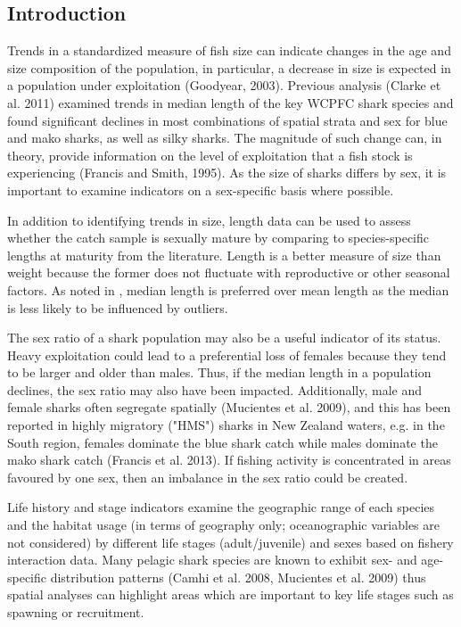 \documentclass[12pt]{SCreport}
\begin{document}
      \subsection{Introduction}
Trends in a standardized measure of fish size can indicate changes in the age and size composition of the population, in particular, a decrease in size is expected in a population under exploitation (Goodyear, 2003).  Previous analysis (Clarke et al. 2011) examined trends in median length of the key WCPFC shark species and found significant declines in most combinations of spatial strata and sex for blue and mako sharks, as well as silky sharks.  The magnitude of such change can, in theory, provide information on the level of exploitation that a fish stock is experiencing (Francis and Smith, 1995). As the size of sharks differs by sex, it is important to examine indicators on a sex-specific basis where possible. 

In addition to identifying trends in size, length data can be used to assess whether the catch sample is sexually mature by comparing to species-specific lengths at maturity from the literature.  Length is a better measure of size than weight because the former does not fluctuate with reproductive or other seasonal factors. As noted in \citet{Francis2014_a}, median length is preferred over mean length as the median is less likely to be influenced by outliers. 

The sex ratio of a shark population may also be a useful indicator of its status. Heavy exploitation could lead to a preferential loss of females because they tend to be larger and older than males. Thus, if the median length in a population declines, the sex ratio may also have been impacted. Additionally, male and female sharks often segregate spatially (Mucientes et al. 2009), and this has been reported in
highly migratory ("HMS") sharks in New Zealand waters, e.g. in the South region, females dominate the blue shark catch while males dominate the mako shark catch (Francis et al. 2013). If fishing activity is concentrated in areas favoured by one sex, then an imbalance in the sex ratio could be created.

Life history and stage indicators examine the geographic range of each species and the habitat usage (in terms of geography only; oceanographic variables are not considered) by different life stages (adult/juvenile) and sexes based on fishery interaction data.  Many pelagic shark species are known to exhibit sex- and age- specific distribution patterns (Camhi et al. 2008, Mucientes et al. 2009) thus                                            spatial analyses can highlight areas which are important to key life stages such as spawning or recruitment.
\end{document}
